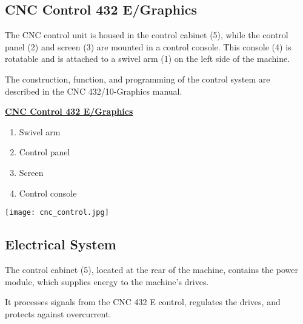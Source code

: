 \newpage

\subsection{CNC Control 432 E/Graphics}

The CNC control unit is housed in the control cabinet (5), while the control panel (2) and screen (3) are mounted in a control console. This console (4) is rotatable and is attached to a swivel arm (1) on the left side of the machine.

\vspace{0.3cm}

\noindent The construction, function, and programming of the control system are \\described in the CNC 432/10-Graphics manual.

\vspace{-.3cm}


\begin{minipage}[b]{0.5\textwidth}
    \textbf{\uline{CNC Control 432 E/Graphics}}
    \begin{enumerate}[itemsep=1pt,parsep=0pt]
        \item Swivel arm
        \item Control panel
        \item Screen
        \item Control console
    \end{enumerate}
\end{minipage}%
\begin{minipage}{0.5\textwidth}
    \centering
    \texttt{[image: cnc\_control.jpg]}
    \label{fig:cnc_control}
\end{minipage}

\vspace{-1cm}

\subsection{Electrical System}

The control cabinet (5), located at the rear of the machine, contains the power module, which supplies energy to the machine’s drives.

\vspace{0.3cm}

\noindent It processes signals from the CNC 432 E control, regulates the drives, and protects against overcurrent.

